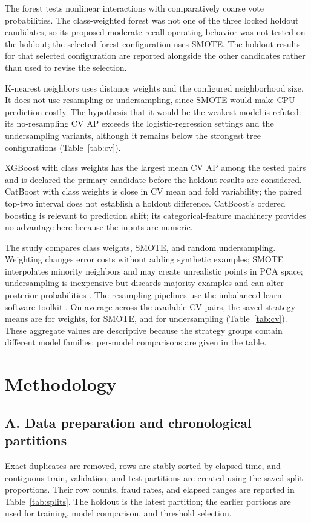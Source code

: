 \documentclass[journal]{IEEEtran}
\begin{document}
The forest tests nonlinear interactions with comparatively coarse vote probabilities. The class-weighted forest was not one of the three locked holdout candidates, so its proposed moderate-recall operating behavior was not tested on the holdout; the selected forest configuration uses SMOTE. The holdout results for that selected configuration are reported alongside the other candidates rather than used to revise the selection.

K-nearest neighbors uses distance weights and the configured neighborhood size. It does not use resampling or undersampling, since SMOTE would make CPU prediction costly. The hypothesis that it would be the weakest model is refuted: its no-resampling CV AP exceeds the logistic-regression settings and the undersampling variants, although it remains below the strongest tree configurations (Table~\ref{tab:cv}).

XGBoost with class weights has the largest mean CV AP among the tested pairs and is declared the primary candidate before the holdout results are considered. CatBoost with class weights is close in CV mean and fold variability; the paired top-two interval does not establish a holdout difference. CatBoost's ordered boosting is relevant to prediction shift; its categorical-feature machinery provides no advantage here because the inputs are numeric.

The study compares class weights, SMOTE, and random undersampling. Weighting changes error costs without adding synthetic examples; SMOTE interpolates minority neighbors and may create unrealistic points in PCA space; undersampling is inexpensive but discards majority examples and can alter posterior probabilities \cite{dalpozzo2015,chawla2002,blagus2013smote}. The resampling pipelines use the imbalanced-learn software toolkit \cite{JMLR:v18:16-365}. On average across the available CV pairs, the saved strategy means are \WeightsStrategyMeanAP{} for weights, \SmoteStrategyMeanAP{} for SMOTE, and \UndersampleStrategyMeanAP{} for undersampling (Table~\ref{tab:cv}). These aggregate values are descriptive because the strategy groups contain different model families; per-model comparisons are given in the table.
\FloatBarrier

\section{Methodology}
\label{sec:method}
\subsection{A. Data preparation and chronological partitions}
Exact duplicates are removed, rows are stably sorted by elapsed time, and contiguous train, validation, and test partitions are created using the saved split proportions. Their row counts, fraud rates, and elapsed ranges are reported in Table~\ref{tab:splits}. The holdout is the latest partition; the earlier portions are used for training, model comparison, and threshold selection.
\end{document}

